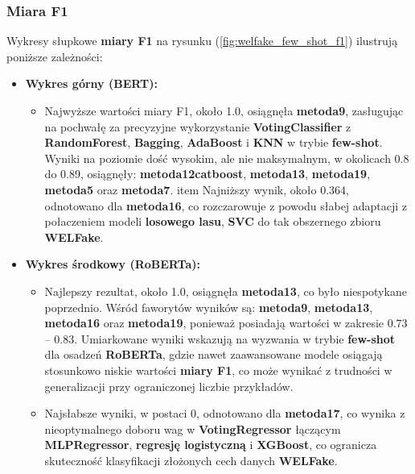 \subsubsection{Miara F1}
Wykresy słupkowe \textbf{miary F1} na rysunku (\ref{fig:welfake_few_shot_f1}) ilustrują poniższe zależności:

\begin{itemize}
	\item \textbf{Wykres górny (BERT):}
	      \begin{itemize}
		      \item Najwyższe wartości miary F1, około 1.0, osiągnęła \textbf{metoda9}, zasługując na pochwałę za precyzyjne wykorzystanie \textbf{VotingClassifier} z \textbf{RandomForest}, \textbf{Bagging}, \textbf{AdaBoost} i \textbf{KNN} w trybie \textbf{few-shot}. Wyniki na poziomie dość wysokim, ale nie maksymalnym, w okolicach 0.8 do 0.89, osiągnęły: \textbf{metoda12\-catboost}, \textbf{metoda13}, \textbf{metoda19}, \textbf{metoda5} oraz \textbf{metoda7}.
		            item Najniższy wynik, około 0.364, odnotowano dla \textbf{metoda16}, co rozczarowuje z powodu słabej adaptacji z połaczeniem modeli \textbf{losowego lasu}, \textbf{SVC} do tak obszernego zbioru \textbf{WELFake}.
	      \end{itemize}

	\item \textbf{Wykres środkowy (RoBERTa):}
	      \begin{itemize}
		      \item Najlepszy rezultat, około 1.0, osiągnęła \textbf{metoda13}, co było niespotykane poprzednio. Wśród faworytów wyników są: \textbf{metoda9}, \textbf{metoda13}, \textbf{metoda16} oraz \textbf{metoda19}, ponieważ posiadają wartości w zakresie 0.73 -- 0.83. Umiarkowane wyniki wskazują na wyzwania w trybie \textbf{few-shot} dla osadzeń \textbf{RoBERTa}, gdzie nawet zaawansowane modele osiągają stosunkowo niskie wartości \textbf{miary F1}, co może wynikać z trudności w generalizacji przy ograniczonej liczbie przykładów.
		      \item Najsłabsze wyniki, w postaci 0, odnotowano dla \textbf{metoda17}, co wynika z nieoptymalnego doboru wag w \textbf{VotingRegressor} łączącym \textbf{MLPRegressor}, \textbf{regresję logistyczną} i \textbf{XGBoost}, co ogranicza skuteczność klasyfikacji złożonych cech danych \textbf{WELFake}.
	      \end{itemize}


\end{itemize}
